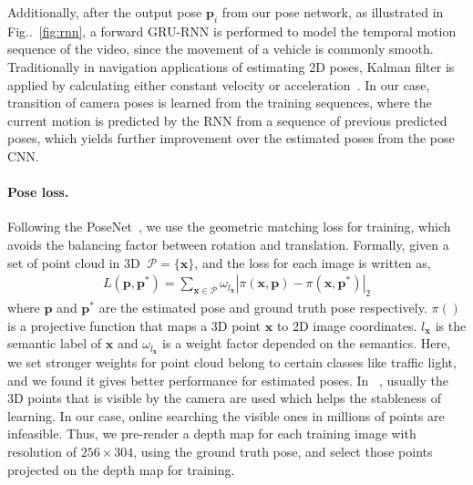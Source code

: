 \documentclass[10pt,twocolumn,letterpaper]{article}
\makeatletter
\newcommand{\figref}[1]{Fig\onedot~\ref{#1}}
\newcommand{\ve}[1]{{\mathbf #1}} %
\newcommand{\hua}[1]{{\mathcal #1}}
\DeclareRobustCommand\onedot{\futurelet\@let@token\@onedot}
\def\onedot{\ifx\@let@token.\else.\null\fi\xspace}
\makeatother
\begin{document}
Additionally, after the output pose $\ve{p}_i$ from our pose network, as illustrated in \figref{fig:rnn}, a forward GRU-RNN is performed to model the temporal motion sequence of the video, since the movement of a vehicle is commonly smooth.
Traditionally in navigation applications of estimating 2D poses,  Kalman filter is applied by calculating either constant velocity or acceleration~\cite{}. 
In our case, transition of camera poses is learned from the training sequences, where the current motion is predicted by the RNN from a sequence of previous predicted poses, which yields further improvement over the estimated poses from the pose CNN.


\paragraph{Pose loss.} 
Following the PoseNet~\cite{}, we use the geometric matching loss for training, which avoids the balancing factor between rotation and translation. 
Formally, given a set of point cloud in 3D $~\hua{P}=\{\ve{x}\}$, and the loss for each image is written as,
\begin{align}
L(\ve{p}, \ve{p}^*) = \sum_{\ve{x} \in \hua{P}}\omega_{l_\ve{x}}|\pi(\ve{x}, \ve{p}) - \pi(\ve{x}, \ve{p}^*)|_2
\label{eq:proj_loss}
\end{align}
where $\ve{p}$ and $\ve{p}^*$ are the estimated pose and ground truth pose respectively. $\pi()$ is a projective function that maps a 3D point $\ve{x}$ to 2D image coordinates. $l_\ve{x}$ is the semantic label of $\ve{x}$ and $\omega_{l_\ve{x}}$ is a weight factor depended on the semantics. Here, we set stronger weights for point cloud belong to certain classes like traffic light, and we found it gives better performance for estimated poses.
In ~\cite{}, usually the 3D points that is visible by the camera are used which helps the stableness of learning. In our case, online searching the visible ones in millions of points are infeasible. 
Thus, we pre-render a depth map for each training image with resolution of $256 \times 304$, using the ground truth pose, and select those points projected on the depth map for training.
\end{document}
